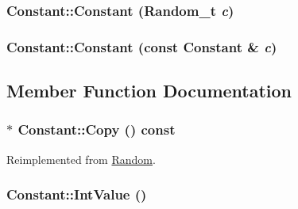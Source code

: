 \hypertarget{classConstant_df7e77573a679532a767f9557ed1745c}{
\subsubsection[{Constant}]{\setlength{\rightskip}{0pt plus 5cm}Constant::Constant ({\bf Random\_\-t} {\em c})}}
\label{classConstant_df7e77573a679532a767f9557ed1745c}


\hypertarget{classConstant_0b4f8d8027a80d77b80ff8a186bd3c12}{
\subsubsection[{Constant}]{\setlength{\rightskip}{0pt plus 5cm}Constant::Constant (const {\bf Constant} \& {\em c})}}
\label{classConstant_0b4f8d8027a80d77b80ff8a186bd3c12}




\subsection{Member Function Documentation}
\hypertarget{classConstant_47fc42d1d87bddf581084ae6b495ab2f}{
\subsubsection[{Copy}]{ $\ast$ Constant::Copy () const}}
\label{classConstant_47fc42d1d87bddf581084ae6b495ab2f}




Reimplemented from \hyperlink{classRandom_22b2951acd2008e8ff58fae434ab7ac5}{Random}.\hypertarget{classConstant_e7b431ef8fb785186bb846d23b5ccb95}{
\subsubsection[{IntValue}]{ Constant::IntValue ()}}
\label{classConstant_e7b431ef8fb785186bb846d23b5ccb95}




